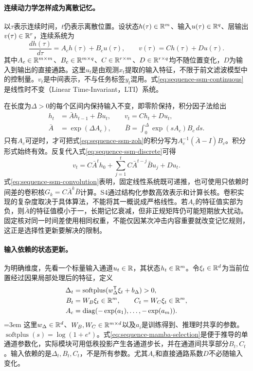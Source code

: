 \paragraph{连续动力学怎样成为离散记忆。}
以$\tau$表示连续时间，$t$仍表示离散位置。设状态$h(\tau)\in\mathbb{R}^m$、输入$u(\tau)\in\mathbb{R}^q$、层输出$v(\tau)\in\mathbb{R}^r$，连续系统为
\begin{equation}
 \frac{d h(\tau)}{d\tau}=A_c h(\tau)+B_c u(\tau),\qquad
 v(\tau)=Ch(\tau)+Du(\tau).
 \label{eq:sequence-ssm-continuous}
\end{equation}
其中$A_c\in\mathbb{R}^{m\times m}$、$B_c\in\mathbb{R}^{m\times q}$、$C\in\mathbb{R}^{r\times m}$、$D\in\mathbb{R}^{r\times q}$均不随位置变化，$D$为输入到输出的直接通路。这里$u_t$是由观测$x_t$提取的输入特征，不限于前文滤波模型中的控制量。$v_t$是中间表示，不与任务标签$y_t$混用。式\eqref{eq:sequence-ssm-continuous}是线性时不变（Linear Time-Invariant，LTI）系统。

在长度为$\Delta>0$的每个区间内保持输入不变，即零阶保持，积分因子法给出
\begin{align}
 h_t&=\bar A h_{t-1}+\bar B u_t,\qquad v_t=Ch_t+Du_t,
 \label{eq:sequence-ssm-discrete}\\
 \bar A&=\exp(\Delta A_c),\qquad
 \bar B=\int_0^\Delta\exp(sA_c)B_c\,ds.
 \label{eq:sequence-ssm-zoh}
\end{align}
只有$A_c$可逆时，才可把式\eqref{eq:sequence-ssm-zoh}的积分写为$A_c^{-1}(\bar A-I)B_c$。积分形式始终有效。反复代入式\eqref{eq:sequence-ssm-discrete}可得
\begin{equation}
 v_t=C\bar A^t h_0+\sum_{j=1}^t C\bar A^{t-j}\bar B u_j+Du_t.
 \label{eq:sequence-ssm-convolution}
\end{equation}
式\eqref{eq:sequence-ssm-convolution}表明，固定线性系统既可递推，也可使用只依赖时间差的卷积核$G_k=C\bar A^k\bar B$计算。S4通过结构化参数高效表示和计算长核。卷积实现的复杂度取决于具体算法，不能将其一概说成严格线性。若$A_c$的特征值实部为负，则$\bar A$的特征值模小于一，长期记忆衰减，但非正规矩阵仍可能短期放大扰动。固定核对同一时间差使用相同权重，不能仅因某次冲击内容重要就改变记忆规则，这正是选择性更新要解决的限制。

\paragraph{输入依赖的状态更新。}
为明确维度，先看一个标量输入通道$u_t\in\mathbb{R}$，其状态$h_t\in\mathbb{R}^m$。令$\xi_t\in\mathbb{R}^d$为当前位置经过因果局部处理后的特征，定义
\begin{align}
 \Delta_t&=\operatorname{softplus}(w_\Delta^{\mathsf T}\xi_t+b_\Delta)>0,
 \label{eq:sequence-mamba-selection}\\
 B_t&=W_B\xi_t\in\mathbb{R}^m,\qquad C_t=W_C\xi_t\in\mathbb{R}^m,\\
 A_c&=\operatorname{diag}(-\exp(a_1),\ldots,-\exp(a_m)).\nonumber
\end{align}
\begingroup\emergencystretch=3em
这里$w_\Delta\in\mathbb{R}^d$、$W_B,W_C\in\mathbb{R}^{m\times d}$以及$a_i$是训练得到、推理时共享的参数。$\operatorname{softplus}(s)=\log(1+e^s)$。式\eqref{eq:sequence-mamba-selection}是便于推导的单通道参数化，实际模块可用低秩投影产生各通道步长，并在通道间共享部分$B_t,C_t$。输入依赖的是$\Delta_t,B_t,C_t$，不是所有参数。尤其$A_c$和直接通路系数$D$不必随输入变化。\par
\endgroup

